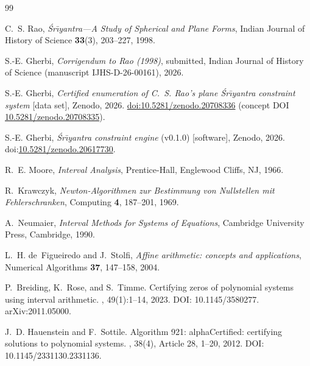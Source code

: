 \documentclass[11pt]{article}
\newcommand{\sri}{\'Sr\={\i}yantra}
\begin{document}
\begin{thebibliography}{99}

C.~S. Rao,
\newblock \emph{\sri{}---A Study of Spherical and Plane Forms},
\newblock Indian Journal of History of Science \textbf{33}(3), 203--227, 1998.

S.-E. Gherbi,
\newblock \emph{Corrigendum to Rao (1998)},
\newblock submitted, Indian Journal of History of Science (manuscript IJHS-D-26-00161), 2026.

S.-E. Gherbi,
\newblock \emph{Certified enumeration of C.~S. Rao's plane \sri{} constraint system}
[data set],
\newblock Zenodo, 2026. \href{https://doi.org/10.5281/zenodo.20708336}{doi:10.5281/zenodo.20708336}
(concept DOI \href{https://doi.org/10.5281/zenodo.20708335}{10.5281/zenodo.20708335}).

S.-E. Gherbi,
\newblock \emph{\sri{} constraint engine} (v0.1.0) [software],
\newblock Zenodo, 2026. doi:\allowbreak\url{10.5281/zenodo.20617730}.

R.~E. Moore,
\newblock \emph{Interval Analysis},
\newblock Prentice-Hall, Englewood Cliffs, NJ, 1966.

R.~Krawczyk,
\newblock \emph{{N}ewton-Algorithmen zur Bestimmung von Nullstellen mit Fehlerschranken},
\newblock Computing \textbf{4}, 187--201, 1969.

A.~Neumaier,
\newblock \emph{Interval Methods for Systems of Equations},
\newblock Cambridge University Press, Cambridge, 1990.

L.~H. de~Figueiredo and J.~Stolfi,
\newblock \emph{Affine arithmetic: concepts and applications},
\newblock Numerical Algorithms \textbf{37}, 147--158, 2004.

P.~Breiding, K.~Rose, and S.~Timme.
\newblock Certifying zeros of polynomial systems using interval arithmetic.
, 49(1):1--14, 2023.
\newblock DOI: 10.1145/3580277. arXiv:2011.05000.

J.~D. Hauenstein and F.~Sottile.
\newblock Algorithm 921: {alphaCertified}: certifying solutions to polynomial systems.
, 38(4), Article 28, 1--20, 2012.
\newblock DOI: 10.1145/2331130.2331136.

\end{thebibliography}
\end{document}
